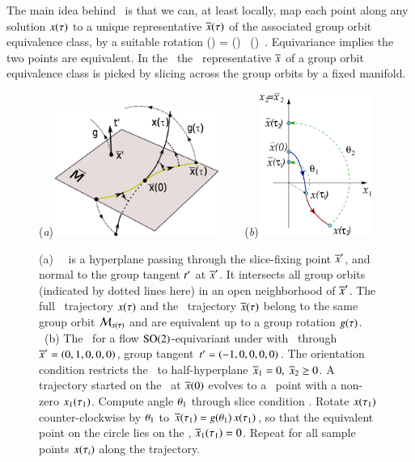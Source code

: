 \documentclass[final,number,sort&compress]{elsarticle}
\begin{document}
The main idea behind \mframes\ is that we can, at least locally,
map each point along any solution $x(\tau)$ to a unique
representative $\overline{x}(\tau)$ of the associated
group orbit equivalence class, by a suitable rotation
\beq
\ssp(\tau) = \LieEl(\tau) \, \sspRed(\tau)
\,.
Equivariance implies the two points are equivalent. In the
\mframes\ the \reducedsp\ representative $\overline{x}$ of a
group orbit equivalence class is picked by slicing across the
group orbits by a fixed manifold.
%
\begin{figure}[ht]
\begin{center}
(\textit{a})\includegraphics[width=0.48\textwidth,clip=true]{ReducTraj3}
~~~~(\textit{b})\includegraphics[width=0.33\textwidth,clip=true]{ESunrot}
\end{center}
\caption{
(a)
\Slice\ \pSRed\ is a hyperplane 
passing through the slice-fixing point ${\overline{x}'}$,
and normal to the group tangent $t'_{}$ at ${\overline{x}'}$.
It intersects all
group orbits (indicated by dotted lines here) in an open
neighborhood of ${\overline{x}'}$.  The full
\statesp\ trajectory $x(\tau)$ and the \reducedsp\
trajectory $\overline{x}(\tau)$ belong to the same group orbit
${\cal M}_{x(\tau)}$ and are equivalent up to a group rotation
$g(\tau)$.
~(b)
The \mframes\ for a flow $\textrm{SO}(2)$-equi\-vari\-ant under
 with \slice\ through ${\overline{x}'}=(0,1,0,0,0)$,
group tangent $t'_{}=(-1,0,0,0,0)$. The
orientation condition restricts the \slice\ to half-hyperplane
$\overline{x}_1=0,\;\overline{x}_2\ge 0$. A trajectory started on the
\slice\ at $\overline{x}(0)$ evolves to a \statesp\ point with a
non-zero $x_1(\tau_1)$. Compute angle ${\bf \theta}_1$
through slice condition . Rotate $x(\tau_1)$
counter-clockwise by ${\bf \theta}_1$ to $\overline{x}(\tau_1) =
g({\bf \theta}_1)\,x(\tau_1)$, so that the equivalent point
on the circle lies on the \slice, $\overline{x}_1(\tau_1) =0$. Repeat
for all sample points $x(\tau_i)$ along the trajectory.
}\label{fig:ReducTraj}
\end{figure}
%
\end{document}
